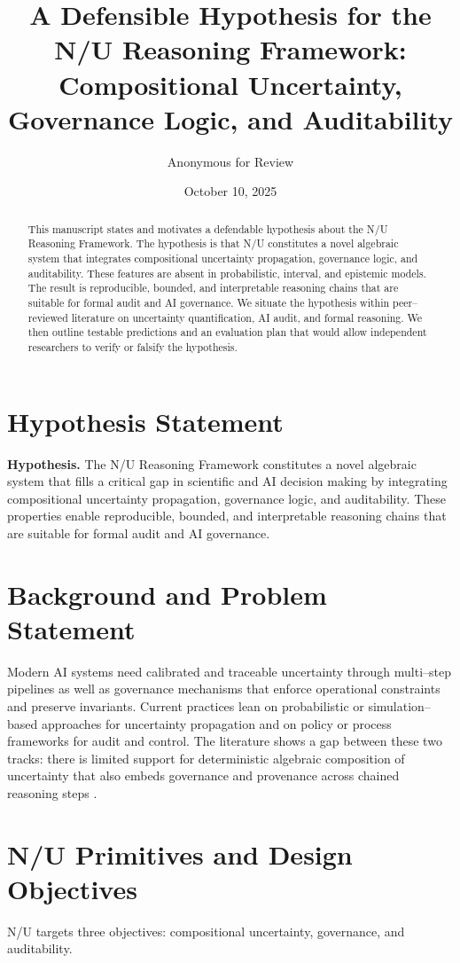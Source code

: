 \documentclass[11pt]{article}
\title{A Defensible Hypothesis for the N/U Reasoning Framework: Compositional Uncertainty, Governance Logic, and Auditability}
\author{Anonymous for Review}
\date{October 10, 2025}
\begin{document}
\maketitle

\begin{abstract}
This manuscript states and motivates a defendable hypothesis about the N/U Reasoning Framework. The hypothesis is that N/U constitutes a novel algebraic system that integrates compositional uncertainty propagation, governance logic, and auditability. These features are absent in probabilistic, interval, and epistemic models. The result is reproducible, bounded, and interpretable reasoning chains that are suitable for formal audit and AI governance. We situate the hypothesis within peer--reviewed literature on uncertainty quantification, AI audit, and formal reasoning. We then outline testable predictions and an evaluation plan that would allow independent researchers to verify or falsify the hypothesis.
\end{abstract}

\section{Hypothesis Statement}
\textbf{Hypothesis.} The N/U Reasoning Framework constitutes a novel algebraic system that fills a critical gap in scientific and AI decision making by integrating compositional uncertainty propagation, governance logic, and auditability. These properties enable reproducible, bounded, and interpretable reasoning chains that are suitable for formal audit and AI governance.

\section{Background and Problem Statement}
Modern AI systems need calibrated and traceable uncertainty through multi--step pipelines as well as governance mechanisms that enforce operational constraints and preserve invariants. Current practices lean on probabilistic or simulation--based approaches for uncertainty propagation and on policy or process frameworks for audit and control. The literature shows a gap between these two tracks: there is limited support for deterministic algebraic composition of uncertainty that also embeds governance and provenance across chained reasoning steps \cite{Mezzi2024,Zhao2025,NASA2023,IIA2024,IBM2025}.

\section{N/U Primitives and Design Objectives}
N/U targets three objectives: compositional uncertainty, governance, and auditability.
\end{document}
